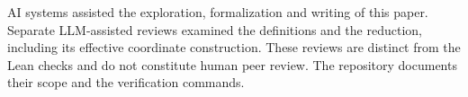 AI systems assisted the exploration, formalization and writing of this
paper. Separate LLM-assisted reviews examined the definitions and the
reduction, including its effective coordinate construction. These
reviews are distinct from the Lean checks and do not constitute human
peer review. The repository documents their scope and the verification
commands.
